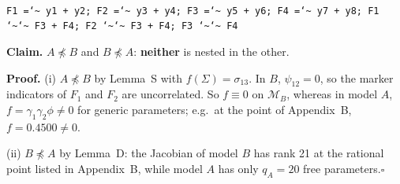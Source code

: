 \documentclass[10pt,a4paper]{article}
\newcommand{\nnest}{\not\preceq}
\begin{document}
\begin{minipage}[t]{0.49\textwidth}
\\[1pt]{\scriptsize \texttt{F1 =\char`\~{} y1 + y2; F2 =\char`\~{} y3 + y4; F3 =\char`\~{} y5 + y6; F4 =\char`\~{} y7 + y8; F1 \char`\~{}\char`\~{} F3 + F4; F2 \char`\~{}\char`\~{} F3 + F4; F3 \char`\~{}\char`\~{} F4}}\end{minipage}
\par\bigskip
\noindent\textbf{Claim.} $A \nnest B$ and $B \nnest A$: \textbf{neither} is nested in the other.\par\smallskip
\noindent\textbf{Proof.} (i) $A\nnest B$ by Lemma~S with $f(\Sigma)=\sigma_{13}$. In $B$, $\psi_{12}=0$, so the marker indicators of $F_1$ and $F_2$ are uncorrelated. So $f\equiv0$ on $\mathcal M_B$, whereas in model $A$, $f=\gamma_1\gamma_2\phi\neq0$ for generic parameters; e.g.\ at the point of Appendix~B, $f=0.4500\neq0$.\par\smallskip
\noindent(ii) $B\nnest A$ by Lemma~D: the Jacobian of model $B$ has rank 21 at the rational point listed in Appendix~B, while model $A$ has only $q_A=20$ free parameters.\hfill$\square$\par\medskip
{}

\clearpage
\end{document}

